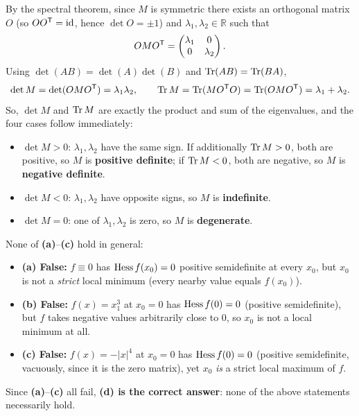 \begin{exercisesolution}
\label{sol:signature_2x2_matrix}
By the spectral theorem, since $M$ is symmetric there exists an orthogonal matrix $O$
(so $OO^{\mathsf{T}} = \operatorname{id}$, hence $\det O = \pm 1$) and $\lambda_1, \lambda_2 \in \mathbb{R}$ such that
\[OMO^{\mathsf{T}} = \begin{pmatrix} \lambda_1 & 0 \\ 0 & \lambda_2 \end{pmatrix}.\]
Using $\det(AB) = \det(A)\det(B)$ and $\operatorname{Tr}(AB) = \operatorname{Tr}(BA)$,
\[\det M = \det(OMO^{\mathsf{T}}) = \lambda_1\lambda_2, \qquad \operatorname{Tr} M = \operatorname{Tr}(MO^{\mathsf{T}} O) = \operatorname{Tr}(OMO^{\mathsf{T}}) = \lambda_1 + \lambda_2.\]
So, $\det M$ and $\operatorname{Tr} M$ are exactly the product and sum of the eigenvalues, and the four cases
follow immediately:
\begin{itemize}
  \item $\det M > 0$: $\lambda_1, \lambda_2$ have the same sign. If additionally $\operatorname{Tr} M > 0$,
    both are positive, so $M$ is \textbf{positive definite}; if $\operatorname{Tr} M < 0$, both are negative,
    so $M$ is \textbf{negative definite}.
  \item $\det M < 0$: $\lambda_1, \lambda_2$ have opposite signs, so $M$ is \textbf{indefinite}.
  \item $\det M = 0$: one of $\lambda_1, \lambda_2$ is zero, so $M$ is \textbf{degenerate}.
\end{itemize}
\end{exercisesolution}

\begin{exercisesolution}
\label{sol:semidefinite_hessian_multiple_choice}
None of \textbf{(a)}--\textbf{(c)} hold in general:
\begin{itemize}
  \item \textbf{(a) False:} $f \equiv 0$ has $\operatorname{Hess} f(x_0) = 0$ positive semidefinite at every
    $x_0$, but $x_0$ is not a \emph{strict} local minimum (every nearby value equals $f(x_0)$).
  \item \textbf{(b) False:} $f(x) = x_1^3$ at $x_0 = 0$ has $\operatorname{Hess} f(0) = 0$ (positive
    semidefinite), but $f$ takes negative values arbitrarily close to $0$, so $x_0$ is not a
    local minimum at all.
  \item \textbf{(c) False:} $f(x) = -\lvert x\rvert^4$ at $x_0 = 0$ has $\operatorname{Hess} f(0) = 0$
    (positive semidefinite, vacuously, since it is the zero matrix), yet $x_0$ \emph{is} a
    strict local maximum of $f$.
\end{itemize}
Since \textbf{(a)}--\textbf{(c)} all fail, \textbf{(d) is the correct answer}: none of the above
statements necessarily hold.
\end{exercisesolution}

